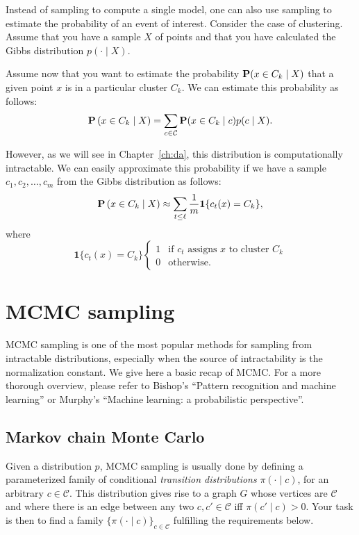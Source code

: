 Instead of sampling to compute a single model, one can also use sampling to estimate the probability of an event of interest. Consider the case of clustering. Assume that you have a sample $X$ of points and that you have calculated the Gibbs distribution $p(\cdot \mid X)$. 

Assume now that you want to estimate the probability $\mathbf{P}(x \in C_k \mid X)$ that a given point $x$ is in a particular cluster $C_k$. We can estimate this probability as follows:
%
\begin{equation}
\mathbf{P}\left(x \in C_k \mid X\right) = \sum_{c \in \mathcal{C}} \mathbf{P}(x \in C_k \mid c) p(c \mid X).
\end{equation}

However, as we will see in Chapter~\ref{ch:da}, this distribution is computationally intractable. We can easily approximate this probability if we have a sample $c_1, c_2, \ldots, c_m$ from the Gibbs distribution as follows:
%
\begin{equation}
\mathbf{P}\left(x \in C_k \mid X\right) \approx \sum_{t \leq \ell} \frac{1}{m}\mathbf{1}\{c_t(x) = C_k\},
\end{equation}
%
where
%
\begin{equation}
\mathbf{1}\{c_t(x) = C_k\}
\begin{cases}
1 & \text{if $c_t$ assigns $x$ to cluster $C_k$}\\
0 & \text{otherwise.}
\end{cases}
\end{equation}
%

\section{MCMC sampling}
\label{sec:mcmc}

MCMC sampling is one of the most popular methods for sampling from
intractable distributions, especially when the source of intractability is the
normalization constant. We give here a basic recap of MCMC. For a more
thorough overview, please refer to Bishop's ``Pattern recognition and machine
learning'' or Murphy's ``Machine learning: a probabilistic perspective''.

\subsection{Markov chain Monte Carlo}

Given a distribution $p$, MCMC sampling is usually done by defining a
parameterized family of conditional \emph{transition distributions} $\pi(\cdot \mid c)$, for an
arbitrary $c \in \mathcal{C}$. This distribution gives rise to a graph $G$ whose vertices
are $\mathcal{C}$ and where there is an edge between any two $c, c' \in \mathcal{C}$ iff $\pi(c' \mid c) > 0$. Your task is then to find a family $\{\pi(\cdot \mid c)\}_{c \in \mathcal{C}}$ fulfilling the requirements below.

